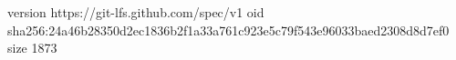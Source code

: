 version https://git-lfs.github.com/spec/v1
oid sha256:24a46b28350d2ec1836b2f1a33a761c923e5c79f543e96033baed2308d8d7ef0
size 1873
